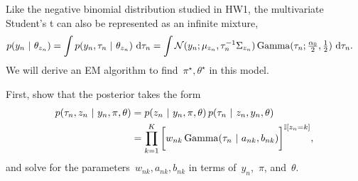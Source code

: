\begin{enumerate}[label=(\alph*)]
Like the negative binomial distribution studied in HW1, the multivariate Student's t can also be represented as an infinite mixture,
\begin{align*}
    p(y_n ~\vert~ \theta_{z_n}) &= \int p(y_n, \tau_n ~\vert~ \theta_{z_n}) \, \mathop{}\!\mathrm{d} \tau_n 
    = \int \mathcal{N}(y_n ; \mu_{z_n}, \tau_n^{-1} \Sigma_{z_n}) \, \mathrm{Gamma}(\tau_n ; \tfrac{\alpha_0}{2}, \tfrac{1}{2}) \, \mathop{}\!\mathrm{d} \tau_n.
\end{align*}
We will derive an EM algorithm to find~$\pi^\star, \theta^\star$ in this model. 

First, show that the posterior takes the form
\begin{align*}
    p(\tau_n, z_n ~\vert~ y_n, \pi, \theta) &= p(z_n ~\vert~ y_n, \pi, \theta) \, p(\tau_n ~\vert~ z_n, y_n, \theta)\\
    &= \prod_{k=1}^K \bigg[ w_{nk} \, \mathrm{Gamma}(\tau_n ~\vert~ a_{nk}, b_{nk}) \bigg]^{\mathbb{I}[z_n = k]},
\end{align*}
and solve for the parameters~$w_{nk}, a_{nk}, b_{nk}$ in terms of~$y_n$,~$\pi$, and~$\theta$.

\begin{solution}


\end{solution}
\end{enumerate}

